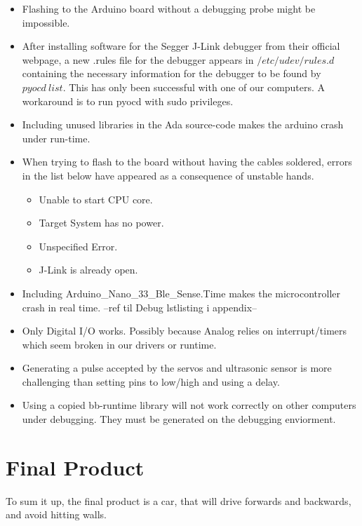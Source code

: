 \documentclass{article}
\begin{document}
\begin{itemize}
	\item Flashing to the Arduino board without a debugging probe might be impossible.

	\item After installing software for the Segger J-Link debugger from their official webpage, a new .rules file for the debugger appears in $/etc/udev/rules.d$ containing the necessary information for the debugger to be found by $pyocd\ list$. This has only been successful with one of our computers. A workaround is to run pyocd with sudo privileges.

	\item Including unused libraries in the Ada source-code makes the arduino crash under run-time.

	\item When trying to flash to the board without having the cables soldered, errors in the list below have appeared as a consequence of unstable hands.
		\begin{itemize}
			\item Unable to start CPU core.
			\item Target System has no power.
            \item Unspecified Error.
            \item J-Link is already open.
		\end{itemize}

	\item Including Arduino\_Nano\_33\_Ble\_Sense.Time makes the microcontroller crash in real time. --ref til Debug lstlisting i appendix--

	\item Only Digital I/O works. Possibly because Analog relies on interrupt/timers which seem broken in our drivers or runtime.

	\item Generating a pulse accepted by the servos and ultrasonic sensor is more challenging than setting pins to low/high and using a delay.

	\item Using a copied bb-runtime library will not work correctly on other computers under debugging. They must be generated on the debugging enviorment.

\end{itemize}

\section{Final Product}
To sum it up, the final product is a car, that will drive forwards and backwards, and avoid hitting walls. 
\end{document}
